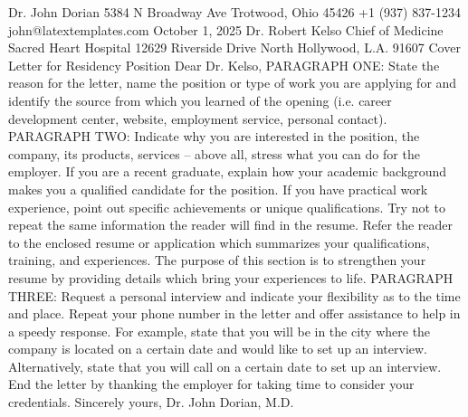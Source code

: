 Dr. John Dorian
5384 N Broadway Ave
Trotwood, Ohio 45426
+1 (937) 837-1234
john@latextemplates.com
October 1, 2025
Dr. Robert Kelso
Chief of Medicine
Sacred Heart Hospital
12629 Riverside Drive
North Hollywood, L.A. 91607
Cover Letter for Residency Position
Dear Dr. Kelso,
PARAGRAPH ONE: State the reason for the letter, name the position or type of work you
are applying for and identify the source from which you learned of the opening (i.e. career
development center, website, employment service, personal contact).
PARAGRAPH TWO: Indicate why you are interested in the position, the company, its products,
services – above all, stress what you can do for the employer. If you are a recent graduate,
explain how your academic background makes you a qualified candidate for the position. If
you have practical work experience, point out specific achievements or unique qualifications.
Try not to repeat the same information the reader will find in the resume. Refer the reader
to the enclosed resume or application which summarizes your qualifications, training, and
experiences. The purpose of this section is to strengthen your resume by providing details
which bring your experiences to life.
PARAGRAPH THREE: Request a personal interview and indicate your flexibility as to the time
and place. Repeat your phone number in the letter and offer assistance to help in a speedy
response. For example, state that you will be in the city where the company is located on a
certain date and would like to set up an interview. Alternatively, state that you will call on a
certain date to set up an interview. End the letter by thanking the employer for taking time to
consider your credentials.
Sincerely yours,
Dr. John Dorian, M.D.
